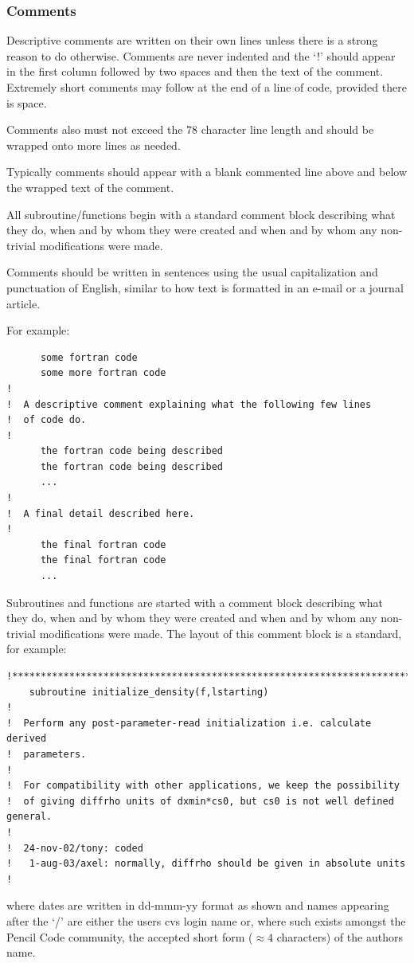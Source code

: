 \documentclass[\mydriver,12pt,twoside,notitlepage,a4paper]{article}
\begin{document}
\subsubsection{Comments}

Descriptive comments are written on their own lines unless there is a strong
reason to do otherwise. Comments are never indented and the `!' should appear
in the first column followed by two spaces and then the text of the comment.
Extremely short comments may follow at the end of a line of code, provided
there is space.

Comments also must not exceed the 78 character line length and should be
wrapped onto more lines as needed.

Typically comments should appear with a blank commented line above and below
the wrapped text of the comment.

All subroutine/functions begin with a standard comment block describing what
they do, when and by whom they were created and when and by whom any
non-trivial modifications were made.

Comments should be written in sentences using the usual capitalization and
punctuation of English, similar to how text is formatted in an e-mail or a
journal article.

For example:
\begin{verbatim}
      some fortran code
      some more fortran code
!
!  A descriptive comment explaining what the following few lines
!  of code do.
!
      the fortran code being described
      the fortran code being described
      ...
!
!  A final detail described here.
!
      the final fortran code
      the final fortran code
      ...
\end{verbatim}

Subroutines and functions are started with a comment block describing
what they do, when and by whom they were created and when and by whom any
non-trivial modifications were made. The layout of this comment block
is a standard, for example:
\begin{verbatim}
!***********************************************************************
    subroutine initialize_density(f,lstarting)
!
!  Perform any post-parameter-read initialization i.e. calculate derived
!  parameters.
!
!  For compatibility with other applications, we keep the possibility
!  of giving diffrho units of dxmin*cs0, but cs0 is not well defined general.
!
!  24-nov-02/tony: coded
!   1-aug-03/axel: normally, diffrho should be given in absolute units
!
\end{verbatim}
where dates are written in dd-mmm-yy format as shown and names appearing
after the `/' are either the users cvs login name or, where such exists
amongst the {\sc Pencil Code} community, the accepted short form ($\approx 4$
characters) of the authors name.
\end{document}
